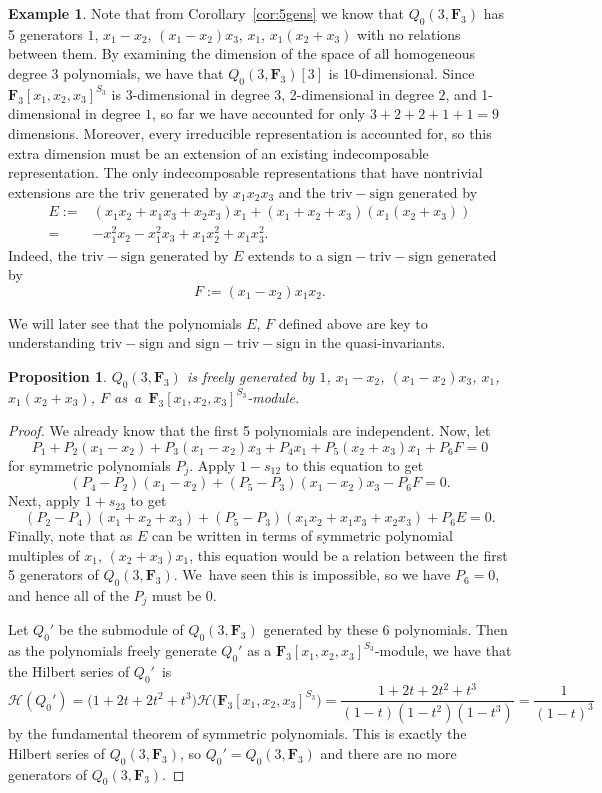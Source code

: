 \documentclass[pdftex]{sigma}
\newtheorem{Proposition}[Theorem]{Proposition}
\theoremstyle{definition}
\newtheorem{Example}[Theorem]{Example}
\numberwithin{equation}{section}
\newcommand{\F}{\mathbf{F}}
\newcommand{\triv}{\mathrm{triv}}
\newcommand{\six}{\mathrm{sign-triv-sign}}
\newcommand{\tign}{\mathrm{triv-sign}}
\begin{document}
 \begin{Example}%
 Note that from Corollary~\ref{cor:5gens} we know that $Q_0(3,\mathbf{F}_3)$ has 5 generators $1$, $x_1-x_2$, $(x_1-x_2)x_3$, $x_1$, $x_1(x_2+x_3)$ with no relations between them. By examining the dimension of the space of all homogeneous degree 3 polynomials, we have that $Q_0(3,\mathbf{F}_3)[3]$ is 10-dimensional. Since $\mathbf{F}_3[x_1,x_2,x_3]^{S_3}$ is 3-dimensional in degree $3$, 2-dimensional in degree $2$, and 1-dimensional in degree $1$, so far we have accounted for only $3+2+2+1+1=9$ dimensions. Moreover, every irreducible representation is accounted for, so this extra dimension must be an extension of an existing indecomposable representation. The only indecomposable representations that have nontrivial extensions are the $\triv$ generated by $x_1x_2x_3$ and the $\tign$ generated by
 \begin{align*}
 E :={}& (x_1x_2+x_1x_3+x_2x_3)x_1+(x_1+x_2+x_3)(x_1(x_2+x_3))\\
 ={}& {-}x_1^2x_2-x_1^2x_3+x_1x_2^2+x_1x_3^2.
 \end{align*}
 Indeed, the $\tign$ generated by $E$ extends to a $\six$ generated by
 \[F:=(x_1-x_2)x_1x_2.\]
 \end{Example}

 We will later see that the polynomials $E$, $F$ defined above are key to understanding $\tign$ and $\six$ in the quasi-invariants.

 \begin{Proposition}\label{prop:q0}
 $Q_0(3,\mathbf{F}_3)$ is freely generated by $1$, $x_1-x_2$, $(x_1-x_2)x_3$, $x_1$, $x_1(x_2+x_3)$, $F$ as~a~$\mathbf{F}_3[x_1,x_2,x_3]^{S_3}$-module.
 \end{Proposition}
 \begin{proof}
 We already know that the first 5 polynomials are independent. Now, let
 \[P_1+P_2(x_1-x_2)+P_3(x_1-x_2)x_3+P_4x_1+P_5(x_2+x_3)x_1+P_6F=0\]
 for symmetric polynomials $P_j$. Apply $1-s_{12}$ to this equation to get
 \[(P_4-P_2)(x_1-x_2)+(P_5-P_3)(x_1-x_2)x_3-P_6F=0.\]
 Next, apply $1+s_{23}$ to get
 \[(P_2-P_4)(x_1+x_2+x_3)+(P_5-P_3)(x_1x_2+x_1x_3+x_2x_3)+P_6E=0.\]
 Finally, note that as $E$ can be written in terms of symmetric polynomial multiples of $x_1$, ${(x_2+x_3)x_1}$, this equation would be a relation between the first 5 generators of $Q_0(3,\mathbf{F}_3)$. We~have seen this is impossible, so we have $P_6=0$, and hence all of the $P_j$ must be 0.

 Let $Q_0'$ be the submodule of $Q_0(3,\mathbf{F}_3)$ generated by these 6 polynomials. Then as the polynomials freely generate $Q_0'$ as a $\F_3[x_1,x_2,x_3]^{S_3}$-module, we have that the Hilbert series of $Q_0'$~is
 \[\mathcal{H}(Q_0')=\big(1+2t+2t^2+t^3\big)\mathcal{H}\big(\F_3[x_1,x_2,x_3]^{S_3}\big)=\frac{1+2t+2t^2+t^3}{(1-t)(1-t^2)(1-t^3)}=\frac{1}{(1-t)^3}\]
 by the fundamental theorem of symmetric polynomials. This is exactly the Hilbert series of $Q_0(3,\mathbf{F}_3)$, so $Q_0'=Q_0(3,\mathbf{F}_3)$ and there are no more generators of $Q_0(3,\mathbf{F}_3)$.
 \end{proof}
\end{document}
